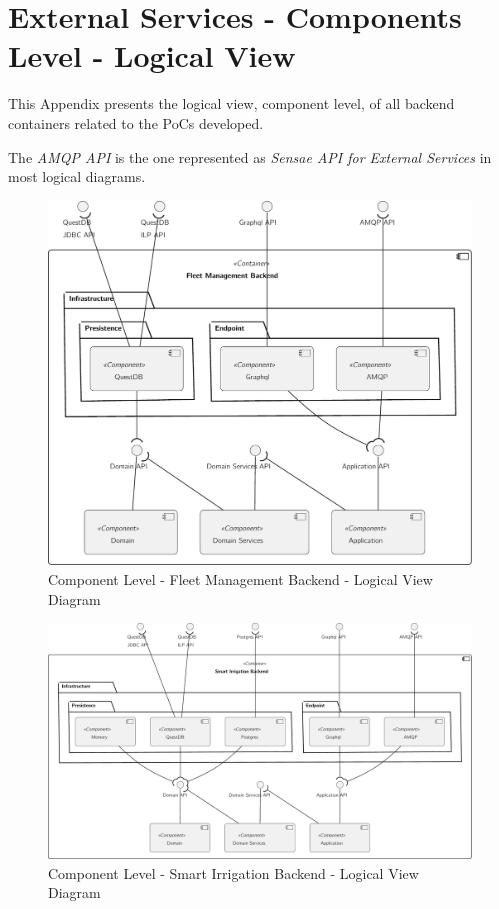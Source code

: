 \chapter{External Services - Components Level - Logical View}
\label{AppendixC2}

This Appendix presents the logical view, component level, of all backend containers related to the \gls{PoC}s developed.

The \textit{AMQP API} is the one represented as \textit{Sensae API for External Services} in most logical diagrams.

\begin{figure}[H]
   \centering
   \includegraphics[page=1,width=0.8\columnwidth]{assets/diagrams/design/architectural/level3/logical/fleet-management-backend.pdf}
   \caption[Component Level - Fleet Management Backend - Logical View Diagram]{Component Level - Fleet Management Backend - Logical View Diagram}
   \label{fig:AppendixC2:fleet}
\end{figure}

\begin{figure}[H]
   \centering
   \includegraphics[page=1,width=\columnwidth]{assets/diagrams/design/architectural/level3/logical/smart-irrigation-backend.pdf}
   \caption[Component Level - Smart Irrigation Backend - Logical View Diagram]{Component Level - Smart Irrigation Backend - Logical View Diagram}
   \label{fig:AppendixC2:irrig}
\end{figure}


